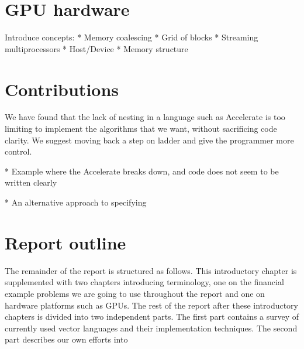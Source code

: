 \section{GPU hardware}
Introduce concepts:
 * Memory coalescing
 * Grid of blocks
 * Streaming multiprocessors
 * Host/Device
 * Memory structure

\section{Contributions}


We have found that the lack of nesting in a language such as
Accelerate is too limiting to implement the algorithms that we want,
without sacrificing code clarity. We suggest moving back a step on
ladder and give the programmer more control.



* Example where the Accelerate breaks down, and code does not seem to
  be written clearly

* An alternative approach to specifying 


\section{Report outline}
The remainder of the report is structured as follows. This
introductory chapter is supplemented with two chapters introducing
terminology, one on the financial example problems we are going to use
throughout the report and one on hardware platforms such as GPUs. The
rest of the report after these introductory chapters is divided into
two independent parts. The first part contains a survey of currently
used vector languages and their implementation techniques. The second
part describes our own efforts into \todo{\ldots}

